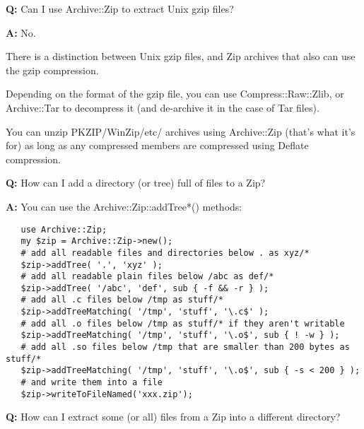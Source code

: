 \documentclass[]{article}
\let\realtextbf=\textbf
\renewcommand{\textbf}[1]{\textcolor{boldcolor}{\realtextbf{#1}}}
\begin{document}
\textbf{Q:} Can I use Archive::Zip to extract Unix gzip files?

\textbf{A:} No.

There is a distinction between Unix gzip files, and Zip archives that
also can use the gzip compression.

Depending on the format of the gzip file, you can use
Compress::Raw::Zlib, or Archive::Tar to decompress it (and de-archive it
in the case of Tar files).

You can unzip PKZIP/WinZip/etc/ archives using Archive::Zip (that's what
it's for) as long as any compressed members are compressed using Deflate
compression.


\textbf{Q:} How can I add a directory (or tree) full of files to a Zip?

\textbf{A:} You can use the Archive::Zip::addTree*() methods:

\begin{verbatim}
   use Archive::Zip;
   my $zip = Archive::Zip->new();
   # add all readable files and directories below . as xyz/*
   $zip->addTree( '.', 'xyz' ); 
   # add all readable plain files below /abc as def/*
   $zip->addTree( '/abc', 'def', sub { -f && -r } );    
   # add all .c files below /tmp as stuff/*
   $zip->addTreeMatching( '/tmp', 'stuff', '\.c$' );
   # add all .o files below /tmp as stuff/* if they aren't writable
   $zip->addTreeMatching( '/tmp', 'stuff', '\.o$', sub { ! -w } );
   # add all .so files below /tmp that are smaller than 200 bytes as stuff/*
   $zip->addTreeMatching( '/tmp', 'stuff', '\.o$', sub { -s < 200 } );
   # and write them into a file
   $zip->writeToFileNamed('xxx.zip');
\end{verbatim}


\textbf{Q:} How can I extract some (or all) files from a Zip into a
different directory?
\end{document}

